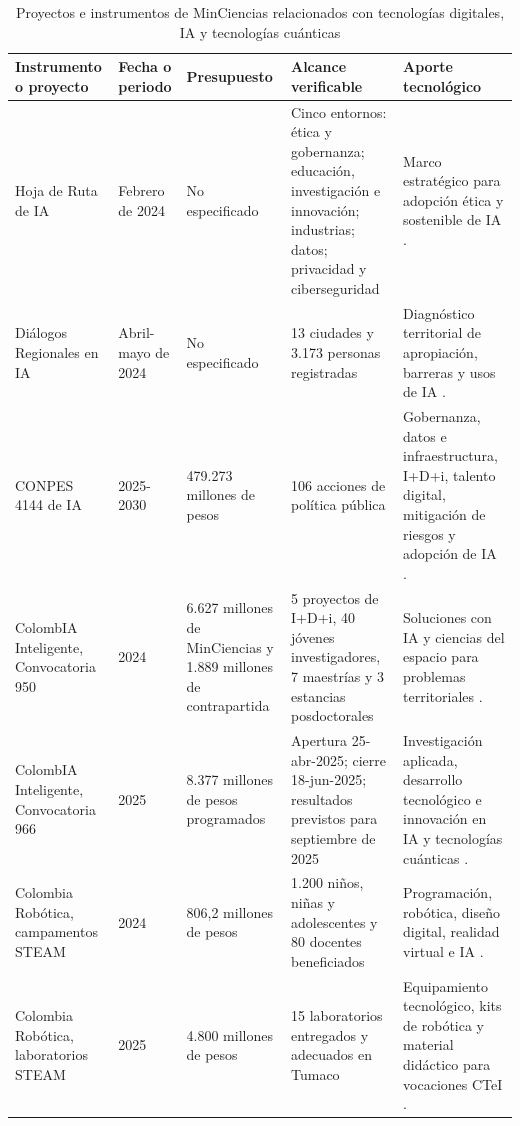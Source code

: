 
\begin{table}[t]
\footnotesize
\centering
\caption{Proyectos e instrumentos de MinCiencias relacionados con tecnologías digitales, IA y tecnologías cuánticas}
\label{tab:minciencias-digital-ia}
\renewcommand{\arraystretch}{1.18}
\setlength{\tabcolsep}{3pt}
\begin{tabular}{p{} p{} p{} p{} p{}}
\hline
\textbf{Instrumento o proyecto} & \textbf{Fecha o periodo} & \textbf{Presupuesto} & \textbf{Alcance verificable} & \textbf{Aporte tecnológico} \\
\hline
Hoja de Ruta de IA & Febrero de 2024 & No especificado & Cinco entornos: ética y gobernanza; educación, investigación e innovación; industrias; datos; privacidad y ciberseguridad & Marco estratégico para adopción ética y sostenible de IA \parencite{minciencias_hoja_ruta_ia_pdf_2024}. \\
Diálogos Regionales en IA & Abril-mayo de 2024 & No especificado & 13 ciudades y 3.173 personas registradas & Diagnóstico territorial de apropiación, barreras y usos de IA \parencite{minciencias_dialogos_ia_pdf_2024}. \\
CONPES 4144 de IA & 2025-2030 & 479.273 millones de pesos & 106 acciones de política pública & Gobernanza, datos e infraestructura, I+D+i, talento digital, mitigación de riesgos y adopción de IA \parencite{conpes_4144_ia_pdf_2025}. \\
ColombIA Inteligente, Convocatoria 950 & 2024 & 6.627 millones de MinCiencias y 1.889 millones de contrapartida & 5 proyectos de I+D+i, 40 jóvenes investigadores, 7 maestrías y 3 estancias posdoctorales & Soluciones con IA y ciencias del espacio para problemas territoriales \parencite{minciencias_rendicion_2024_2025_pdf}. \\
ColombIA Inteligente, Convocatoria 966 & 2025 & 8.377 millones de pesos programados & Apertura 25-abr-2025; cierre 18-jun-2025; resultados previstos para septiembre de 2025 & Investigación aplicada, desarrollo tecnológico e innovación en IA y tecnologías cuánticas \parencite{minciencias_rendicion_2024_2025_pdf}. \\
Colombia Robótica, campamentos STEAM & 2024 & 806,2 millones de pesos & 1.200 niños, niñas y adolescentes y 80 docentes beneficiados & Programación, robótica, diseño digital, realidad virtual e IA \parencite{minciencias_rendicion_2024_2025_pdf}. \\
Colombia Robótica, laboratorios STEAM & 2025 & 4.800 millones de pesos & 15 laboratorios entregados y adecuados en Tumaco & Equipamiento tecnológico, kits de robótica y material didáctico para vocaciones CTeI \parencite{minciencias_rendicion_2024_2025_pdf}. \\

\end{tabular}
\end{table}
